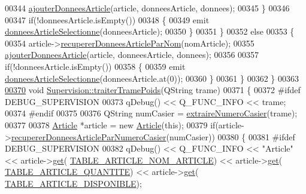 \begin{DoxyCode}
{{{00344             \hyperlink{class_supervision_ae6fc43cb8bdfd8045367c08d8e440359}{ajouterDonneesArticle}(article, donneesArticle, donnees);
00345         \}
00346 
00347         \textcolor{keywordflow}{if}(!donneesArticle.isEmpty())
00348         \{
00349             emit \hyperlink{class_supervision_ae486eafc331964e223c35ae2b54fa669}{donneesArticleSelectionne}(donneesArticle);
00350         \}
00351     \}
00352     \textcolor{keywordflow}{else}
00353     \{
00354         article->\hyperlink{class_article_a6eab145b46f5e1786c5ddf669ffabb6e}{recupererDonneesArticleParNom}(nomArticle);
00355         \hyperlink{class_supervision_ae6fc43cb8bdfd8045367c08d8e440359}{ajouterDonneesArticle}(article, donneesArticle, donnees);
00356 
00357         \textcolor{keywordflow}{if}(!donneesArticle.isEmpty())
00358         \{
00359             emit \hyperlink{class_supervision_ae486eafc331964e223c35ae2b54fa669}{donneesArticleSelectionne}(donneesArticle.at(0));
00360         \}
00361     \}
00362 \}
00363 
\hyperlink{class_supervision_ae72bdcb7d70bbb8e13cf61be95ee7c06}{00370} \textcolor{keywordtype}{void} \hyperlink{class_supervision_ae72bdcb7d70bbb8e13cf61be95ee7c06}{Supervision::traiterTramePoids}(QString trame)
00371 \{
00372 \textcolor{preprocessor}{    #ifdef DEBUG\_SUPERVISION}
00373         qDebug() << Q\_FUNC\_INFO << trame;
00374 \textcolor{preprocessor}{    #endif    }
00375 
00376     QString numCasier = \hyperlink{class_supervision_a141a35024b0cb74636a8c6810a1ab26d}{extraireNumeroCasier}(trame);
00377 
00378     \hyperlink{class_article}{Article} *article = \textcolor{keyword}{new} \hyperlink{class_article}{Article}(\textcolor{keyword}{this});
00379     \textcolor{keywordflow}{if}(article->\hyperlink{class_article_a5d8241c703f142bbc8b011f867fd953f}{recupererDonneesArticleParNumeroCasier}(numCasier))
00380     \{
00381 \textcolor{preprocessor}{        #ifdef DEBUG\_SUPERVISION}
00382             qDebug() << Q\_FUNC\_INFO << \textcolor{stringliteral}{"Article"} << article->\hyperlink{class_article_a81e89d4821991a69277f3a0f8e88a001}{get}(
      \hyperlink{_article_8h_a159354683cfd6e1b578172fbe6490ab6a7a309a358c54f9ea482a222d0cb4d135}{TABLE\_ARTICLE\_NOM\_ARTICLE}) << article->\hyperlink{class_article_a81e89d4821991a69277f3a0f8e88a001}{get}(
      \hyperlink{_article_8h_a159354683cfd6e1b578172fbe6490ab6a7273e06be37f8ea80b1c9c16224ebb86}{TABLE\_ARTICLE\_QUANTITE}) << article->\hyperlink{class_article_a81e89d4821991a69277f3a0f8e88a001}{get}(
      \hyperlink{_article_8h_a159354683cfd6e1b578172fbe6490ab6a105c98cbf3533c6bd74eb706c5d524d6}{TABLE\_ARTICLE\_DISPONIBLE});
}}}
\end{DoxyCode}
